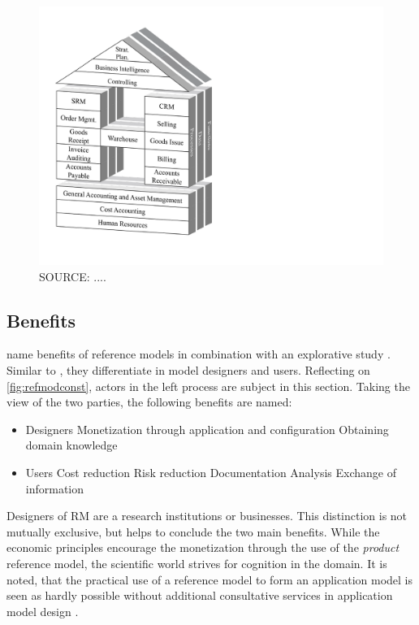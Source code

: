 		\begin{figure}[caption={Retail-H}, label={fig:retailh}]
			{	\includegraphics[width=.6\textwidth]{figures/retailh.pdf}}
			\hspace{6.2cm}	SOURCE:  ....
		\end{figure}
		


		\subsection{Benefits}
		
		\citeauthor{becker2004handelsinformationssysteme} name benefits of reference models in combination with an explorative study \citep[]{Schutte1998}. Similar to \cite{vom2006reusable}, they differentiate in model designers and users. Reflecting on \Fig \ref{fig:refmodconst}, actors in the left process are subject in this section. Taking the view of the two parties, the following benefits are named:
		
		\begin{itemize}
			\item Designers
			\subitem Monetization through application and configuration
			\subitem Obtaining domain knowledge
			\item Users
			\subitem Cost reduction
			\subitem Risk reduction
			\subitem Documentation
			\subitem Analysis
			\subitem Exchange of information  
		\end{itemize} 
	
		Designers of \acrshort{RM} are a research institutions or businesses. This distinction is not mutually exclusive,  but helps to conclude the two main benefits. While the economic principles encourage the monetization through the use of the \textit{product} reference model, the scientific world strives for cognition in the domain. It is noted, that the practical use of a reference model to form an application model is seen as hardly possible without additional consultative services in application model design \citep{Schutte1998}.
	
